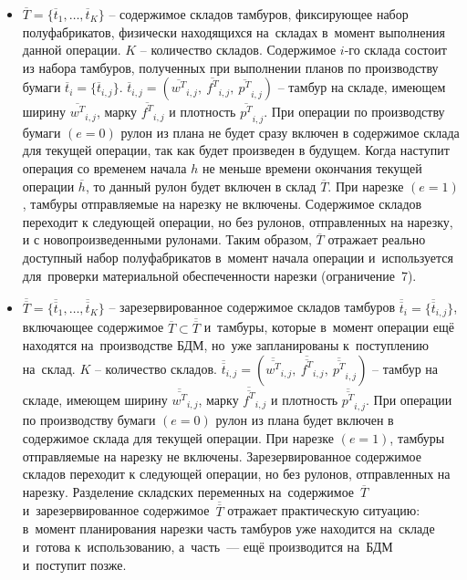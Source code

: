 \begin{itemize}
    \item $\overline{T} = \{{\overline{t}}_{1},\ldots,{\overline{t}}_{K}\}$ -- содержимое складов тамбуров, фиксирующее набор полуфабрикатов, физически находящихся на~складах в~момент выполнения данной операции.
$K$ -- количество складов.
Содержимое $i$-го склада состоит из набора тамбуров, полученных при выполнении планов по производству бумаги ${\overline{t}}_{i} = \{{\overline{t}}_{i,j}\}$.
${\overline{t}}_{i,j} = ({\overline{w^T}}_{i,j},\ {\overline{f^T}}_{i,j},\ {\overline{p^T}}_{i,j})$ -- тамбур на складе, имеющем ширину ${\overline{w^T}}_{i,j}$, марку ${\overline{f^T}}_{i,j}$ и плотность ${\overline{p^T}}_{i,j}$.
При операции по производству бумаги $(e = 0)$ рулон из плана не будет сразу включен в содержимое склада для текущей операции, так как будет произведен в будущем.
Когда наступит операция со временем начала $h$ не меньше времени окончания текущей операции $\overline{h}$, то данный рулон будет включен в склад $\overline{T}$.
При нарезке $(e = 1)$, тамбуры отправляемые на нарезку не включены.
Содержимое складов переходит к следующей операции, но без рулонов, отправленных на нарезку, и с новопроизведенными рулонами.
Таким образом, $\overline{T}$ отражает реально доступный набор полуфабрикатов в~момент начала операции и~используется для~проверки материальной обеспеченности нарезки (ограничение~7).
    \item $\overline{\overline{T}} = \{{\overline{\overline{t}}}_{1},\ldots,{\overline{\overline{t}}}_{K}\}$ -- зарезервированное содержимое складов тамбуров ${\overline{\overline{t}}}_{i} = \{{\overline{\overline{t}}}_{i,j}\}$, включающее содержимое $\overline{T} \subset \overline{\overline{T}}$ и~тамбуры, которые в~момент операции ещё находятся на~производстве БДМ, но~уже запланированы к~поступлению на~склад.
$K$ -- количество складов.
${\overline{\overline{t}}}_{i,j} = ({\overline{\overline{w^T}}}_{i,j},\ {\overline{\overline{f^T}}}_{i,j},\ {\overline{\overline{p^T}}}_{i,j})$ -- тамбур на складе, имеющем ширину ${\overline{\overline{w^T}}}_{i,j}$, марку ${\overline{\overline{f^T}}}_{i,j}$ и плотность ${\overline{\overline{p^T}}}_{i,j}$.
При операции по производству бумаги $(e = 0)$ рулон из плана будет включен в содержимое склада для текущей операции.
При нарезке $(e = 1)$, тамбуры отправляемые на нарезку не включены.
Зарезервированное содержимое складов переходит к следующей операции, но без рулонов, отправленных на нарезку.
Разделение складских переменных на~содержимое~$\overline{T}$ и~зарезервированное содержимое~$\overline{\overline{T}}$ отражает практическую ситуацию: в~момент планирования нарезки часть тамбуров уже находится на~складе и~готова к~использованию, а~часть~--- ещё производится на~БДМ и~поступит позже.

\end{itemize}
